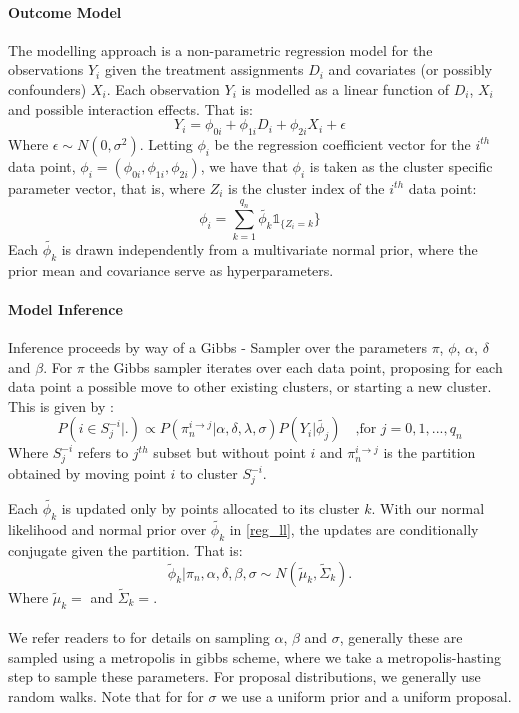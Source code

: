 \documentclass{article}
\begin{document}
\paragraph{Outcome Model}
The modelling approach is a non-parametric regression model for the observations $Y_i$ given the treatment assignments $D_i$ and covariates (or possibly confounders) $X_i$.  Each observation $Y_i$ is modelled as a linear function of $D_i$, $X_i$ and possible interaction effects. That is:
\begin{equation}
    Y_i = \phi_{0i} + \phi_{1i}D_i + \phi_{2i}X_i + \epsilon
\label{reg_ll}
\end{equation}
Where $\epsilon \sim N(0,\sigma^2)$. Letting $\phi_i$ be the regression coefficient vector for the $i^{th}$ data point, $\phi_i = (\phi_{0i}, \phi_{1i}, \phi_{2i})$, we have that $\phi_i$ is taken as the cluster specific parameter vector, that is, where $Z_i$ is the cluster index of the $i^{th}$ data point:
\begin{equation}
    \phi_i = \sum_{k=1}^{q_n} \tilde{\phi_k} \mathbb{1}_{\{Z_i=k}\}
\end{equation}
Each $\tilde{\phi_k}$ is drawn independently from a multivariate normal prior, where the prior mean and covariance serve as hyperparameters.

\paragraph{Model Inference} 
Inference proceeds by way of a Gibbs - Sampler over the parameters $\pi$, $\phi$, $\alpha$, $\delta$ and $\beta$. For $\pi$ the Gibbs sampler iterates over each data point, proposing for each data point a possible move to other existing clusters, or starting a new cluster. This is given by :
\begin{equation}
    P(i \in S_j^{-i} |.) \propto P(\pi_n^{i \rightarrow j} | \alpha, \delta, \lambda, \sigma)P(Y_i | \tilde{\phi_j})  \quad \text{,for } j=0,1,...,q_n
\end{equation}
Where $S_j^{-i}$ refers to $j^{th}$ subset but without point $i$ and $\pi_n^{i \rightarrow j}$ is the partition obtained by moving point $i$ to cluster $S_j^{-i}$.

Each $\tilde{\phi_k}$ is updated only by points allocated to its cluster $k$. With our normal likelihood and normal prior over $\tilde{\phi_k}$ in \ref{reg_ll}, the updates are conditionally conjugate given the partition. That is:
\begin{equation}
    \tilde{\phi}_k | \pi_n, \alpha, \delta, \beta, \sigma \sim N(\tilde{\mu}_k, \tilde{\Sigma}_k). 
\end{equation}
Where $\tilde{\mu}_k = $ and $\tilde{\Sigma}_k=$.
\\ \\ 
We refer readers to \cite{dahl2017random} for details on sampling $\alpha$, $\beta$ and $\sigma$, generally these are sampled using a metropolis in gibbs scheme, where we take a metropolis-hasting step to sample these parameters. For proposal distributions, we generally use random walks. Note that for for $\sigma$ we use a uniform prior and a uniform proposal. 
\end{document}

